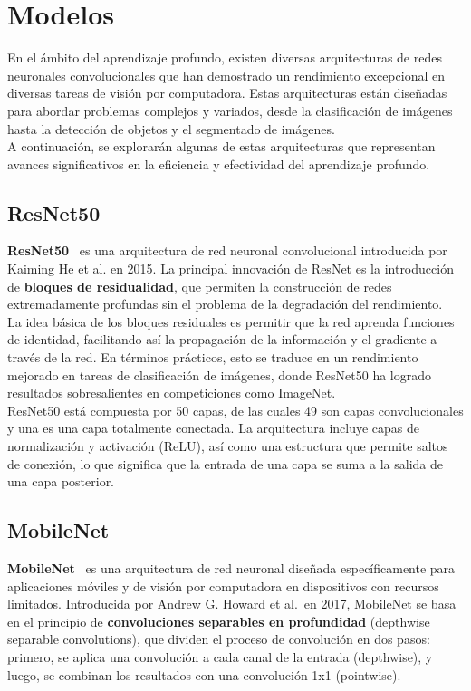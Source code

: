 \section{Modelos}\label{sec:modelos}
En el ámbito del aprendizaje profundo, existen diversas arquitecturas de redes neuronales convolucionales que han
demostrado un rendimiento excepcional en diversas tareas de visión por computadora.
Estas arquitecturas están diseñadas para abordar problemas complejos y variados, desde la clasificación de imágenes
hasta la detección de objetos y el segmentado de imágenes. \\[6pt]

A continuación, se explorarán algunas de estas arquitecturas que representan avances significativos en la eficiencia y
efectividad del aprendizaje profundo.

\subsection{ResNet50}\label{subsec:resnet50}
\textbf{ResNet50}~\cite{resnet} es una arquitectura de red neuronal convolucional introducida por Kaiming He et al. en 2015.
La principal innovación de ResNet es la introducción de \textbf{bloques de residualidad}, que permiten la construcción
de redes extremadamente profundas sin el problema de la degradación del rendimiento. \\[6pt]

La idea básica de los bloques residuales es permitir que la red aprenda funciones de identidad, facilitando así la
propagación de la información y el gradiente a través de la red.
En términos prácticos, esto se traduce en un rendimiento mejorado en tareas de clasificación de imágenes, donde
ResNet50 ha logrado resultados sobresalientes en competiciones como ImageNet. \\[6pt]

ResNet50 está compuesta por 50 capas, de las cuales 49 son capas convolucionales y una es una capa totalmente conectada.
La arquitectura incluye capas de normalización y activación (ReLU), así como una estructura que permite saltos de
conexión, lo que significa que la entrada de una capa se suma a la salida de una capa posterior.

\subsection{MobileNet}\label{subsec:mobilenet}
\textbf{MobileNet}~\cite{} es una arquitectura de red neuronal diseñada específicamente para aplicaciones móviles y de visión
por computadora en dispositivos con recursos limitados.
Introducida por Andrew G. Howard et al.\ en 2017, MobileNet se basa en el principio de
\textbf{convoluciones separables en profundidad} (depthwise separable convolutions), que dividen el proceso de
convolución en dos pasos: primero, se aplica una convolución a cada canal de la entrada (depthwise), y luego, se
combinan los resultados con una convolución 1x1 (pointwise). \\[6pt]

